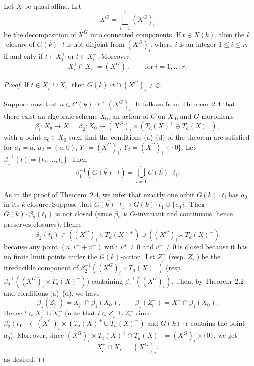 \documentclass[12pt]{article}
\begin{document}
\begin{theorem}[4.2]
Let $X$ be quasi-affine.  
Let 
\[
    X^G = \bigsqcup_{i=1}^r (X^G)_i
\]
be the decomposition of $X^G$ into connected components.  
If $t \in X(k)$, then the $k$-closure of $\overline{G(k)\cdot t}$ is not disjoint from $(X^G)_i$, where $i$ is an integer $1 \le i \le r$, if and only if $t \in X_i^+$ or $t \in X_i^-$.  
Moreover,
\[
    X_i^+ \cap X_i^- = (X^G)_i, \qquad \text{for } i = 1, \dots, r.
\]
\end{theorem}

\begin{proof}
If $t \in X_i^+ \cup X_i^-$ then $\overline{G(k)\cdot t} \cap (X^G)_i \neq \varnothing$.

Suppose now that $a \in \overline{G(k)\cdot t} \cap (X^G)_i$. It follows from Theorem~2.4 that there exist an algebraic scheme $X_0$, an action of $G$ on $X_0$, and $G$-morphisms
\[
  \beta_i : X_0 \longrightarrow X, \quad \beta_2 : X_0 \longrightarrow (X^G)_i \times (T_a(X)^+ \oplus T_a(X)^-),
\]
with a point $a_0 \in X_0$ such that the conditions (a)--(d) of the theorem are satisfied for $a_1 = a$, $a_2 = (a,0)$, $Y_1 = (X^G)_i$, $Y_2 = (X^G)_i \times \{0\}$. Let $\beta_1^{-1}(t) = \{t_1, \ldots, t_s\}$. Then
\[
  \beta_1^{-1}(\overline{G(k)\cdot t}) = \bigcup_{i=1}^s \overline{G(k)\cdot t_i}.
\]

As in the proof of Theorem~2.4, we infer that exactly one orbit $G(k)\cdot t_i$ has $a_0$ in its $k$-closure. Suppose that $\overline{G(k)\cdot t_1} \supset G(k)\cdot t_1 \cup \{a_0\}$. Then $G(k)\cdot \beta_2(t_1)$ is not closed (since $\beta_2$ is $G$-invariant and continuous, hence preserves closures). Hence \[\beta_2(t_1) \in ((X^G)_i \times T_a(X)^+) \cup ((X^G)_i \times T_a(X)^-)\] because any point $(a,v^+ + v^-)$ with $v^+ \neq 0$ and $v^- \neq 0$ is closed because it has no finite limit points under the $G(k)$-action. Let $Z_i^+$ (resp. $Z_i^-$) be the irreducible component of $\beta_2^{-1}((X^G)_i \times T_a(X)^+)$ (resp. $\beta_2^{-1}((X^G)_i \times T_a(X)^-)$) containing $\beta_1^{-1}((X^G)_i)$. Then, by Theorem~2.2 and conditions (a)--(d), we have
\[
  \beta_1(Z_i^+) = X_i^+ \cap \beta_1(X_0), \qquad \beta_1(Z_i^-) = X_i^- \cap \beta_1(X_0).
\]
Hence $t \in X_i^+ \cup X_i^-$ (note that $t \in Z_i^+ \cup Z_i^-$ since $\beta_2(t_1) \in (X^G)_i \times (T_a(X)^+ \cup T_a(X)^-)$ and $G(k)\cdot t$ contains the point $a_0$). Moreover, since $(X^G)_i \times T_a(X)^+ \cap T_a(X)^- = (X^G)_i \times \{0\}$, we get
\[
  X_i^+ \cap X_i^- = (X^G)_i.
\] as desired.
\end{proof}
\end{document}
